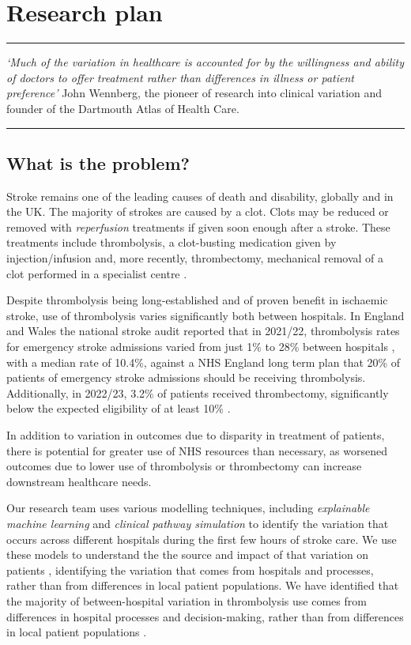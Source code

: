 \section{Research plan}

\vspace{2mm}
\hrule
\textit{`Much of the variation in healthcare is accounted for by the willingness and ability of doctors to offer treatment rather than differences in illness or patient preference'} John Wennberg, the pioneer of research into clinical variation and founder of the Dartmouth Atlas of Health Care.
\vspace{2mm}
\hrule

\subsection{What is the problem?}

Stroke remains one of the leading causes of death and disability, globally and in the UK. The majority of strokes are caused by a clot. Clots may be reduced or removed with \textit{reperfusion} treatments if given soon enough after a stroke. These treatments include thrombolysis, a clot-busting medication given by injection/infusion \cite{emberson_effect_2014} and, more recently, thrombectomy, mechanical removal of a clot performed in a specialist centre \cite{fransen_time_2016}.

Despite thrombolysis being long-established and of proven benefit in ischaemic stroke, use of thrombolysis varies significantly both between hospitals. In England and Wales the national stroke audit reported that in 2021/22, thrombolysis rates for emergency stroke admissions varied from just 1\% to 28\% between hospitals \cite{sentinel_national_stroke_audit_programme_ssnap_2022}, with a median rate of 10.4\%, against a NHS England long term plan that 20\% of patients of emergency stroke admissions should be receiving thrombolysis. Additionally, in 2022/23, 3.2\% of patients received thrombectomy, significantly below the expected eligibility of at least 10\% \cite{mcmeekin_updating_2021}. 

In addition to variation in outcomes due to disparity in treatment of patients, there is potential for greater use of NHS resources than necessary, as worsened outcomes due to lower use of thrombolysis or thrombectomy can increase downstream healthcare needs.

Our research team uses various modelling techniques, including \textit{explainable machine learning} and \textit{clinical pathway simulation} to identify the variation that occurs across different hospitals during the first few hours of stroke care. We use these models to understand the the source and impact of that variation on patients \cite{allen_using_2022, allen_use_2022}, identifying the variation that comes from hospitals and processes, rather than from differences in local patient populations. We have identified that the majority of between-hospital variation in thrombolysis use comes from differences in hospital processes and decision-making, rather than from differences in local patient populations \cite{allen_using_2022, allen_use_2022}.

